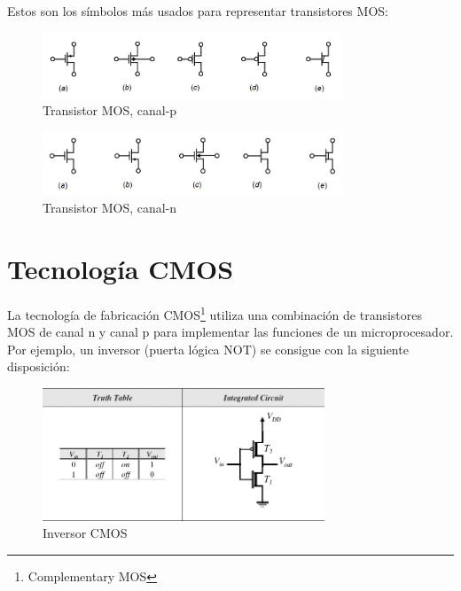 \documentclass[12pt]{report} %
\begin{document}
	Estos son los símbolos más usados para representar transistores MOS:
	
	\begin{figure}[H]
		\includegraphics[width=0.8\textwidth]{p-mos-symbol.png}
		\caption[Transistor MOS, canal-p]{Transistor MOS, canal-p\protect\footnotemark}
		\label{fig:p-mos-symbol.png}
	\end{figure}

	
	\begin{figure}[H]
		\includegraphics[width=0.8\textwidth]{n-mos-symbol.png}
		\caption[Transistor MOS, canal-n]{Transistor MOS, canal-n\protect\footnotemark}
		\label{fig:n-mos-symbol.png}
	\end{figure}
	
	
	
	\section{Tecnología CMOS}
	
	La tecnología de fabricación CMOS\footnote{Complementary MOS} utiliza una combinación de transistores MOS de canal n y canal p para implementar las funciones de un microprocesador. Por ejemplo, un inversor (puerta lógica NOT) se consigue con la siguiente disposición:
	
	\begin{figure}[H]
		\includegraphics[width=0.75\textwidth]{inverter_mos.jpg}
		\caption[Inversor CMOS]{Inversor CMOS\protect\footnotemark}
		\label{fig:inverter_mos.jpg}
	\end{figure}
	
\end{document}
